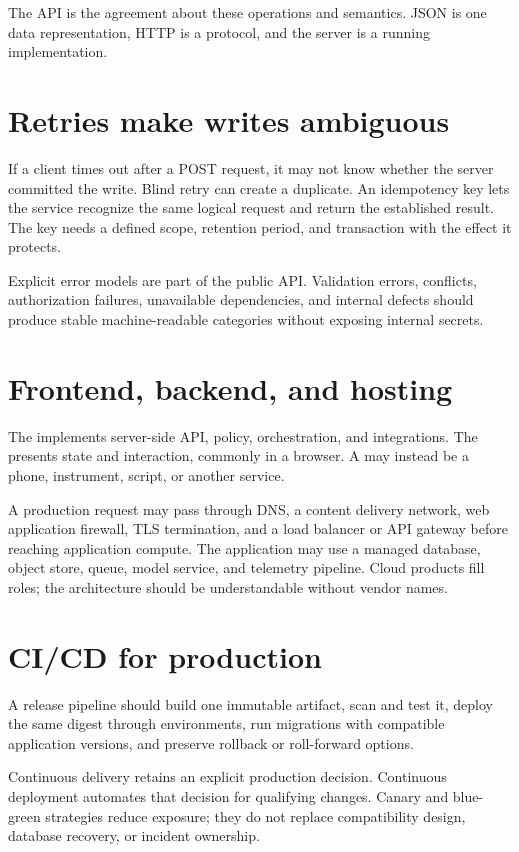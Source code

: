 The API is the agreement about these operations and semantics. JSON is one data
representation, HTTP is a protocol, and the server is a running implementation.

\section{Retries make writes ambiguous}

If a client times out after a POST request, it may not know whether the server
committed the write. Blind retry can create a duplicate. An idempotency key lets
the service recognize the same logical request and return the established
result. The key needs a defined scope, retention period, and transaction with
the effect it protects.

Explicit error models are part of the public API. Validation errors, conflicts,
authorization failures, unavailable dependencies, and internal defects should
produce stable machine-readable categories without exposing internal secrets.

\section{Frontend, backend, and hosting}

The  implements server-side API, policy, orchestration, and
integrations. The  presents state and interaction, commonly in a
browser. A  may instead be a phone, instrument, script, or another
service.

A production request may pass through DNS, a content delivery network, web
application firewall, TLS termination, and a load balancer or API gateway before
reaching application compute. The application may use a managed database,
object store, queue, model service, and telemetry pipeline. Cloud products fill
roles; the architecture should be understandable without vendor names.

\section{CI/CD for production}

A release pipeline should build one immutable artifact, scan and test it,
deploy the same digest through environments, run migrations with compatible
application versions, and preserve rollback or roll-forward options.

Continuous delivery retains an explicit production decision. Continuous
deployment automates that decision for qualifying changes. Canary and blue-green
strategies reduce exposure; they do not replace compatibility design, database
recovery, or incident ownership.

